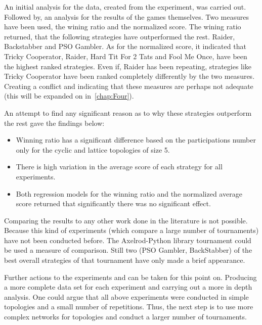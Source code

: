 An initial analysis for the data, created from the experiment, was carried out.
Followed by, an analysis for the results of the games themselves.
Two measures have been used, the wining ratio and the normalized score. The
wining ratio returned, that the following strategies have outperformed the rest.
Raider, Backstabber and PSO Gambler. As for the normalized score, it indicated
that Tricky Cooperator,  Raider, Hard Tit For 2 Tats and Fool Me Once, have been the
highest ranked strategies. Even if, Raider has been repeating, strategies like
Tricky Cooperator have been ranked completely differently by the two measures.
Creating a conflict and indicating that these measures are perhaps not adequate
(this will be expanded on in~\autoref{chap:Four}).

An attempt to find any significant reason as to why these strategies outperform
the rest gave the findings below:

\begin{itemize}
	\item Winning ratio has a significant difference based on the participations
	      number only for the cyclic and lattice topologies of size 5.
	\item There is high variation in the average score of each strategy for all
	      experiments.
	\item Both regression models for the winning ratio and the normalized average
	      score returned that significantly there was no significant effect.
\end{itemize}

Comparing the results to any other work done in the literature is not possible.
Because this kind of experiments (which compare a large number of tournaments)
have not been conducted before.
The Axelrod-Python library tournament could be used  a measure of comparison.
Still two (PSO Gambler, BackStabber) of the best overall strategies of that
tournament have only made a brief appearance.

Further actions to the experiments and can be taken for this point on.
Producing a more complete data set for each experiment and carrying out a more
in depth analysis. One could argue that all above experiments
were conducted in simple topologies and a small number of repetitions. Thus, the
next step is to use more complex networks for topologies and conduct a larger
number of tournaments.
